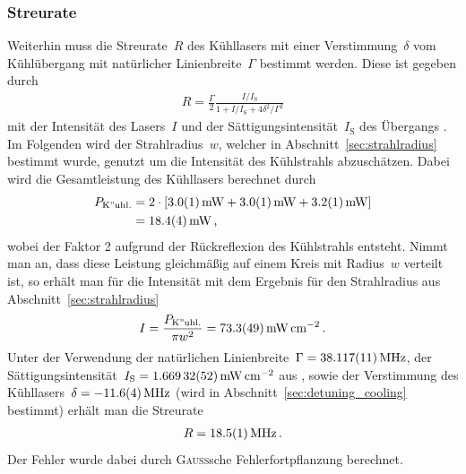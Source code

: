 \documentclass[11pt, a4paper]{article}
\numberwithin{equation}{section}
\begin{document}
\subsubsection{Streurate}
Weiterhin muss die Streurate~$R$ des Kühllasers mit einer Verstimmung~$\delta$ vom Kühlübergang mit natürlicher Linienbreite~$\Gamma$ bestimmt werden.
Diese ist gegeben durch
\begin{align*}
	R = \frac{\Gamma}{2} \frac{I / I_\mathrm{S}}{1 + I / I_\mathrm{S} + 4 \delta^2 / \Gamma^2}
\end{align*}
mit der Intensität des Lasers~$I$ und der Sättigungsintensität~$I_\mathrm{S}$ des Übergangs \cite{foot}.
Im Folgenden wird der Strahlradius~$w$, welcher in Abschnitt~\ref{sec:strahlradius} bestimmt wurde, genutzt um die Intensität des Kühlstrahls abzuschätzen.
Dabei wird die Gesamtleistung des Kühllasers berechnet durch
\begin{align*}
	P_\mathrm{K"uhl.} &= 2 \cdot \left[ \SI{3.0 +- 0.1}{mW} + \SI{3.0 +- 0.1}{mW} + \SI{3.2 +- 0.1}{mW} \right]\\
	  &= \SI{18.4 +- 0.4}{mW} \, \text{,}
\end{align*} 
wobei der Faktor 2 aufgrund der Rückreflexion des Kühlstrahls entsteht.
Nimmt man an, dass diese Leistung gleichmäßig auf einem Kreis mit Radius~$w$ verteilt ist, so erhält man für die Intensität mit dem Ergebnis für den Strahlradius aus Abschnitt~\ref{sec:strahlradius}
\begin{align*}
	I = \frac{P_\mathrm{K"uhl.}}{\pi w^2} = \SI{73.3 +- 4.9}{\milli\watt\per\centi\meter\squared} \, \text{.}
\end{align*}
Unter der Verwendung der natürlichen Linienbreite~$\Gamma = \SI{38.117+-0.011}{MHz}$, der Sättigungsintensität~$I_\mathrm{S} = \SI{1.66932 +- 0.00052}{\milli\watt\per\centi\meter\squared}$ aus \cite{steck}, sowie der Verstimmung des Kühllasers~$\delta = \SI{-11.6+- 0.4}{MHz}$ (wird in Abschnitt~\ref{sec:detuning_cooling} bestimmt) erhält man die Streurate
\begin{align*}
	R = \SI{18.5 +- 0.1}{MHz} \, \text{.}
\end{align*}
Der Fehler wurde dabei durch \textsc{Gauß}sche Fehlerfortpflanzung berechnet.
\end{document}
